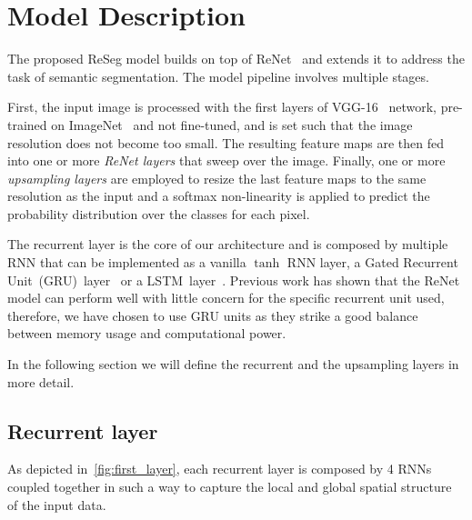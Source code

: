 \section{Model Description}\label{sec:reseg_model}

The proposed ReSeg model builds on top of ReNet~\cite{visin2015renet} and
extends it to address the task of semantic segmentation. The model
pipeline involves multiple stages.

First, the input image is processed with the first layers of
VGG-16~\cite{Simonyan2015} network, pre-trained on
ImageNet~\cite{imagenet_cvpr09} and not fine-tuned, and is set such that the
image resolution does not become too small. The resulting feature maps are then
fed into one or more \emph{ReNet layers} that sweep over the image. Finally,
one or more \emph{upsampling layers} are employed to resize the last feature
maps to the same resolution as the input and a softmax non-linearity is applied
to predict the probability distribution over the classes for each pixel.

The recurrent layer is the core of our architecture and is composed by multiple
RNN that can be implemented as a vanilla $\tanh$ RNN layer, a Gated Recurrent
Unit~(GRU)~layer~\cite{Cho2014} or a
LSTM~layer~\cite{Hochreiter+Schmidhuber-1997}. Previous work has shown that
the ReNet model can perform well with little concern for the specific recurrent
unit used, therefore, we have chosen to use GRU units as they strike a good
balance between memory usage and computational power.

In the following section we will define the recurrent and the upsampling layers
in more detail.

\subsection{Recurrent layer}
As depicted in~\autoref{fig:first_layer}, each recurrent layer is composed
by 4 RNNs coupled together in such a way to capture the local and global
spatial structure of the input data.

